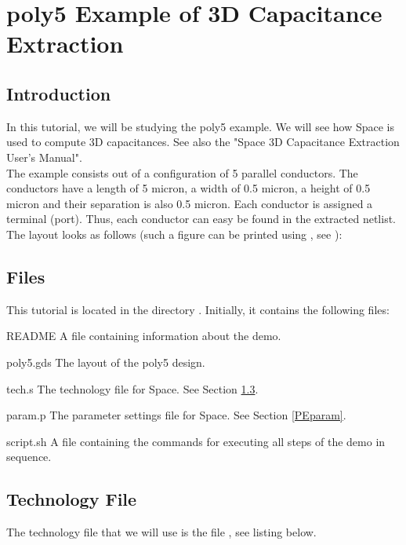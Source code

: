 \chapter{poly5 Example of 3D Capacitance Extraction}
\section{Introduction}
\label{PEintro}
In this tutorial, we will be studying the poly5 example.
We will see how Space is used to compute 3D capacitances.
See also the "Space 3D Capacitance Extraction User's Manual".
\\[1 ex]
The example consists out of a configuration of 5 parallel conductors.
The conductors have a length of 5 micron, a width of 0.5 micron,
a height of 0.5 micron and their separation is also 0.5 micron.
Each conductor is assigned a terminal (port).
Thus, each conductor can easy be found in the extracted netlist.
The layout looks as follows (such a figure can be printed using , see
):

\begin{figure}[h]
\centerline{}
\end{figure}

\section{Files}
This tutorial is located in the directory .
Initially, it contains the following files:
\begin{filelist}
\item[README] A file containing information about the demo.
\item[poly5.gds] The layout of the poly5 design.
\item[tech.s] The technology file for Space. See Section \ref{PEtech}.
\item[param.p] The parameter settings file for Space. See Section \ref{PEparam}.
\item[script.sh] A file containing the commands for executing all
steps of the demo in sequence.
\end{filelist}

\section{Technology File}
\label{PEtech}
The technology file that we will use is the file , see listing below.

